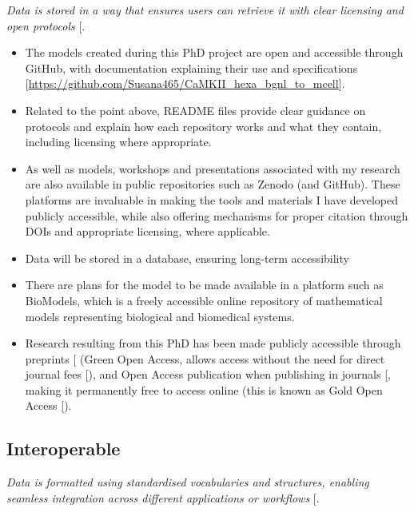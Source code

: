 \documentclass[
  11pt,
  letterpaper,
]{scrreprt}
\providecommand{\tightlist}{%
  \setlength{\itemsep}{0pt}\setlength{\parskip}{0pt}}\usepackage{longtable,booktabs,array}
\begin{document}
\emph{Data is stored in a way that ensures users can retrieve it with
clear licensing and open protocols}
{[}\citeproc{ref-jacobsen2020FAIR}{377}{]}.

\begin{itemize}
\tightlist
\item
  The models created during this PhD project are open and accessible
  through GitHub, with documentation explaining their use and
  specifications
  {[}\url{https://github.com/Susana465/CaMKII_hexa_bgnl_to_mcell}{]}.
\item
  Related to the point above, README files provide clear guidance on
  protocols and explain how each repository works and what they contain,
  including licensing where appropriate.
\item
  As well as models, workshops and presentations associated with my
  research are also available in public repositories such as Zenodo (and
  GitHub). These platforms are invaluable in making the tools and
  materials I have developed publicly accessible, while also offering
  mechanisms for proper citation through DOIs and appropriate licensing,
  where applicable.
\item
  Data will be stored in a database, ensuring long-term accessibility
\item
  There are plans for the model to be made available in a platform such
  as BioModels, which is a freely accessible online repository of
  mathematical models representing biological and biomedical systems.
\item
  Research resulting from this PhD has been made publicly accessible
  through preprints {[}\citeproc{ref-garcia2024Data}{380}{]} (Green Open
  Access, allows access without the need for direct journal fees
  {[}\citeproc{ref-bjork2014Anatomy}{366}{]}), and Open Access
  publication when publishing in journals
  {[}\citeproc{ref-garcia2025Data}{381}{]}, making it permanently free
  to access online (this is known as Gold Open Access
  {[}\citeproc{ref-borrego2023Article}{365}{]}).
\end{itemize}

\subsection{Interoperable}\label{interoperable}

\emph{Data is formatted using standardised vocabularies and structures,
enabling seamless integration across different applications or
workflows} {[}\citeproc{ref-jacobsen2020FAIR}{377}{]}.
\end{document}
